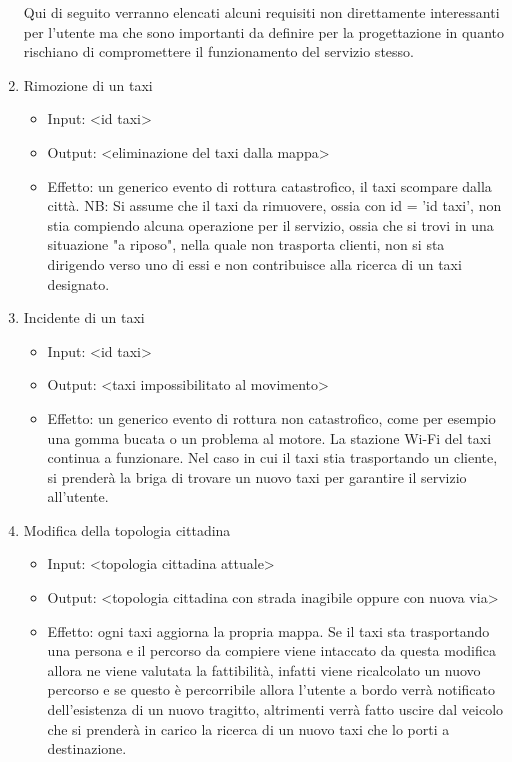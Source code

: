 \begin{enumerate}
	Qui di seguito verranno elencati alcuni requisiti non direttamente interessanti per l'utente ma che sono importanti da definire per la progettazione in quanto rischiano di compromettere il funzionamento del servizio stesso.
	
	\item Rimozione di un taxi
		\begin{itemize}
			\item Input: <id taxi>
			\item Output: <eliminazione del taxi dalla mappa>
			\item Effetto: un generico evento di rottura catastrofico, il taxi scompare dalla città. NB: Si assume che il taxi da rimuovere, ossia con id = 'id taxi', non stia compiendo alcuna operazione per il servizio, ossia che si trovi in una situazione "a riposo", nella quale non trasporta clienti, non si sta dirigendo verso uno di essi e non contribuisce alla ricerca di un taxi designato.
		\end{itemize}
	
	\item Incidente di un taxi
	\begin{itemize}
		\item Input: <id taxi>
		\item Output: <taxi impossibilitato al movimento>
		\item Effetto: un generico evento di rottura non catastrofico, come per esempio una gomma bucata o un problema al motore. La stazione Wi-Fi del taxi continua a funzionare. Nel caso in cui il taxi stia trasportando un cliente, si prenderà la briga di trovare un nuovo taxi per garantire il servizio all'utente.
	\end{itemize}

	\item Modifica della topologia cittadina
		\begin{itemize}
			\item Input: <topologia cittadina attuale>
			\item Output: <topologia cittadina con strada inagibile oppure con nuova via>
			\item Effetto: ogni taxi aggiorna la propria mappa. Se il taxi sta trasportando una persona e il percorso da compiere viene intaccato da questa modifica allora ne viene valutata la fattibilità, infatti viene ricalcolato un nuovo percorso e se questo è percorribile allora l'utente a bordo verrà notificato dell'esistenza di un nuovo tragitto, altrimenti verrà fatto uscire dal veicolo che si prenderà in carico la ricerca di un nuovo taxi che lo porti a destinazione.
		\end{itemize}

\end{enumerate}


